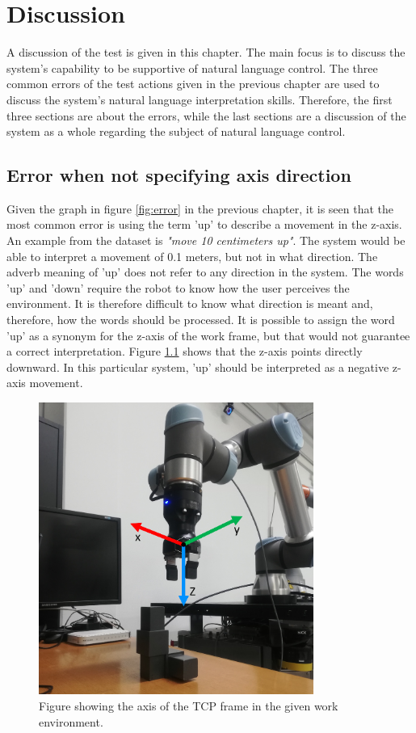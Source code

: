 \chapter{Discussion} \label{ch:discussion}
A discussion of the test is given in this chapter. The main focus is to discuss the system's capability to be supportive of natural language control. The three common errors of the test actions given in the previous chapter are used to discuss the system's natural language interpretation skills. Therefore, the first three sections are about the errors, while the last sections are a discussion of the system as a whole regarding the subject of natural language control.


\section{Error when not specifying axis direction}
Given the graph in figure \ref{fig:error} in the previous chapter, it is seen that the most common error is using the term 'up' to describe a movement in the z-axis. An example from the dataset is \textit{"move 10 centimeters up"}. The system would be able to interpret a movement of 0.1 meters, but not in what direction. The adverb meaning of 'up' does not refer to any direction in the system.
The words 'up' and 'down' require the robot to know how the user perceives the environment. It is therefore difficult to know what direction is meant and, therefore, how the words should be processed.
It is possible to assign the word 'up' as a synonym for the z-axis of the work frame, but that would not guarantee a correct interpretation. Figure \ref{fig:TCP_axis} shows that the z-axis points directly downward. In this particular system, 'up' should be interpreted as a negative z-axis movement.


\begin{figure}[ht]
    \centering
    \includegraphics[width=9cm]{img/axis_of_TCP_frame.png}
    \caption{Figure showing the axis of the TCP frame in the given work environment.}
    \label{fig:TCP_axis}
\end{figure}

